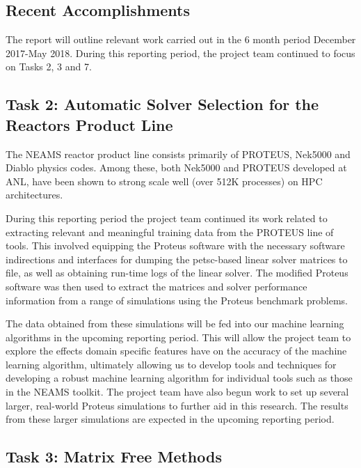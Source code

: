 \subsection{Recent Accomplishments}
The report will outline relevant work carried out in the 6 month period December 2017-May 2018. During this reporting period, the project team continued to focus on Tasks 2, 3 and 7. 

\subsection{Task 2: Automatic Solver Selection for the Reactors Product Line}

The NEAMS reactor product line consists primarily of PROTEUS, Nek5000 and Diablo physics codes. Among these, both Nek5000 and PROTEUS developed at ANL, have been shown to strong scale well (over 512K processes) on HPC architectures. 

During this reporting period the project team continued its work related to extracting relevant and meaningful training data from the PROTEUS line of tools. This involved equipping the Proteus software with the necessary software indirections and interfaces for dumping the petsc-based linear solver matrices to file, as well as obtaining run-time logs of the linear solver. The modified Proteus software was then used to extract the matrices and solver performance information from a range of simulations using the Proteus benchmark problems. 

The data obtained from these simulations will be fed into our machine learning algorithms in the upcoming reporting period. This will allow the project team to explore the effects domain specific features have on the accuracy of the machine learning algorithm, ultimately allowing us to develop tools and techniques for developing a robust machine learning algorithm for individual tools such as those in the NEAMS toolkit. The project team have also begun work to set up several larger, real-world Proteus simulations to further aid in this research. The results from these larger simulations are expected in the upcoming reporting period. 


\subsection{Task 3: Matrix Free Methods}  

